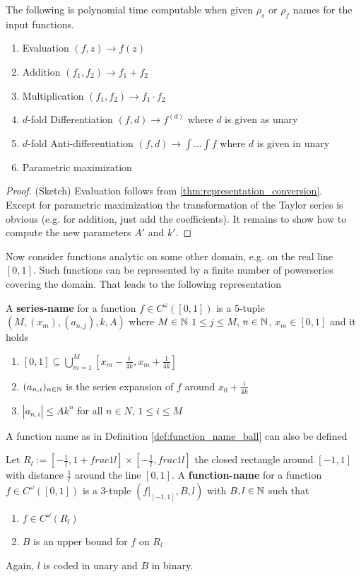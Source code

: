 	 \begin{theorem}\label{thm:polytime_on_ball}
	 	The following is polynomial time computable when given $\rho_s$ or $\rho_f$ names for the input functions.
	 	\begin{enumerate}
	 		\item Evaluation $(f,z) \to f(z)$
	 		\item Addition $(f_1, f_2) \to f_1 + f_2$
	 		\item Multiplication $(f_1, f_2) \to f_1 \cdot f_2$
	 		\item $d$-fold Differentiation $(f,d) \to f^{(d)}$ where $d$ is given as unary
	 		\item $d$-fold Anti-differentiation $(f,d) \to \int \dots \int f$ where $d$ is given in unary
	 		\item Parametric maximization
	 	\end{enumerate}
	 	\begin{proof}(Sketch)
	 		Evaluation follows from \ref{thm:representation_conversion}. \\
	 		Except for parametric maximization the transformation of the Taylor series is obvious (e.g. for addition, just add the coefficients).
	 		It remains to show how to compute the new parameters $A'$ and $k'$. 
	 	\end{proof}
	 \end{theorem}
	Now consider functions analytic on some other domain, e.g. on the real line $[0,1]$.
	Such functions can be represented by a finite number of powerseries covering the domain. 
	That leads to the following representation
	\begin{definition}\label{def:series_name_rect}
		A \textbf{series-name} for a function $f \in C^\omega([0,1])$ is a 5-tuple $(M, (x_m), (a_{n, j}), k, A)$ where $M \in \mathbb N$
		$1 \leq j \leq M$, $n \in \mathbb N$, $x_m \in [0,1]$ and it holds
		\begin{enumerate}
			\item $[0,1] \subseteq \bigcup_{m=1}^M [x_m - \frac{i}{4k}, x_m + \frac{1}{4k}]$
			\item $(a_{n,i})_{n \in \mathbb N}$ is the series expansion of $f$ around $x_0 + \frac{i}{4k}$
			\item $|a_{n,i}| \leq Ak^n$ for all $n \in N$, $1 \leq i \leq M$
		\end{enumerate}
	\end{definition}
	A function name as in Definition \ref{def:function_name_ball} can also be defined
	\begin{definition}
		Let $R_l := [-\frac{1}{l}, 1+frac{1}{l}] \times [-\frac{1}{l}, frac{1}{l}]$ the closed rectangle around $[-1,1]$ 
		with distance $\frac{1}{l}$ around the line $[0,1]$.
		A \textbf{function-name} for a function $f \in C^\omega([0,1])$ is a 3-tuple $(f|_{[-1,1]}, B, l)$ with $B, l \in \mathbb N$ such that 
		\begin{enumerate}
			\item $f \in C^\omega(R_l)$
			\item $B$ is an upper bound for $f$ on $R_l$
		\end{enumerate}
		Again, $l$ is coded in unary and $B$ in binary.
	\end{definition}
